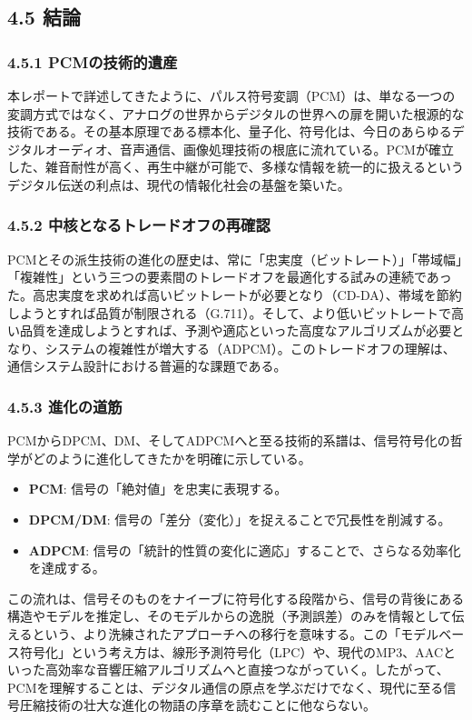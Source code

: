 \documentclass[
  a4paper,  %
  11pt,     %
]{ltjsarticle}%
\begin{document}
\subsection{4.5 結論}

\subsubsection{4.5.1 PCMの技術的遺産}

本レポートで詳述してきたように、パルス符号変調（PCM）は、単なる一つの変調方式ではなく、アナログの世界からデジタルの世界への扉を開いた根源的な技術である。その基本原理である標本化、量子化、符号化は、今日のあらゆるデジタルオーディオ、音声通信、画像処理技術の根底に流れている。PCMが確立した、雑音耐性が高く、再生中継が可能で、多様な情報を統一的に扱えるというデジタル伝送の利点は、現代の情報化社会の基盤を築いた。

\subsubsection{4.5.2 中核となるトレードオフの再確認}

PCMとその派生技術の進化の歴史は、常に「忠実度（ビットレート）」「帯域幅」「複雑性」という三つの要素間のトレードオフを最適化する試みの連続であった。高忠実度を求めれば高いビットレートが必要となり（CD-DA）、帯域を節約しようとすれば品質が制限される（G.711）。そして、より低いビットレートで高い品質を達成しようとすれば、予測や適応といった高度なアルゴリズムが必要となり、システムの複雑性が増大する（ADPCM）。このトレードオフの理解は、通信システム設計における普遍的な課題である。

\subsubsection{4.5.3 進化の道筋}

PCMからDPCM、DM、そしてADPCMへと至る技術的系譜は、信号符号化の哲学がどのように進化してきたかを明確に示している。
\begin{itemize}
    \item \textbf{PCM}: 信号の「絶対値」を忠実に表現する。
    \item \textbf{DPCM/DM}: 信号の「差分（変化）」を捉えることで冗長性を削減する。
    \item \textbf{ADPCM}: 信号の「統計的性質の変化に適応」することで、さらなる効率化を達成する。
\end{itemize}
この流れは、信号そのものをナイーブに符号化する段階から、信号の背後にある構造やモデルを推定し、そのモデルからの逸脱（予測誤差）のみを情報として伝えるという、より洗練されたアプローチへの移行を意味する。この「モデルベース符号化」という考え方は、線形予測符号化（LPC）や、現代のMP3、AACといった高効率な音響圧縮アルゴリズムへと直接つながっていく。したがって、PCMを理解することは、デジタル通信の原点を学ぶだけでなく、現代に至る信号圧縮技術の壮大な進化の物語の序章を読むことに他ならない。
\end{document}
